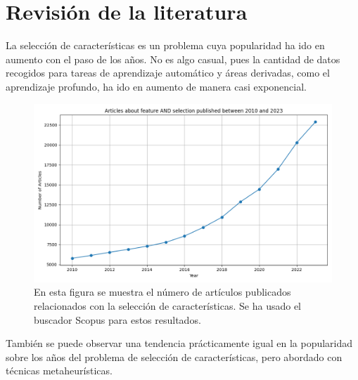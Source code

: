 \chapter{Revisión de la literatura}
La selección de características es un problema cuya popularidad ha ido en aumento con el paso de los años. No es algo casual, pues la cantidad de datos recogidos para tareas de aprendizaje automático y áreas derivadas, como el aprendizaje profundo, ha ido en aumento de manera casi exponencial.

\begin{figure}[H]
  \begin{center}
    \includegraphics[width=1\textwidth]{imagenes/scopus_chart.png}
  \end{center}
  \caption[Popularidad de feature selection sobre los años]{En esta figura se muestra el número de artículos publicados relacionados con la selección de características. Se ha usado el buscador Scopus para estos resultados.}
  \label{fig:pop_fs}
\end{figure}

También se puede observar una tendencia  prácticamente igual en la popularidad sobre los años del problema de selección de características, pero abordado con técnicas metaheurísticas.

